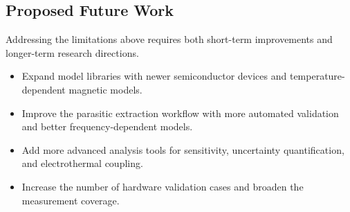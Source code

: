 \subsection{Proposed Future Work}
Addressing the limitations above requires both short-term improvements and longer-term research directions.
\begin{itemize}
    \item Expand model libraries with newer semiconductor devices and temperature-dependent magnetic models.
    \item Improve the parasitic extraction workflow with more automated validation and better frequency-dependent models.
    \item Add more advanced analysis tools for sensitivity, uncertainty quantification, and electrothermal coupling.
    \item Increase the number of hardware validation cases and broaden the measurement coverage.
\end{itemize}
